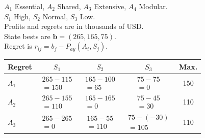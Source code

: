 {\noindent\begin{minipage}[t]{0.46\textwidth}
  \vspace{0pt}
  $A_1$ Essential, $A_2$ Shared, $A_3$ Extensive, $A_4$ Modular.\\
  $S_1$ High, $S_2$ Normal, $S_3$ Low.\\
  Profits and regrets are in thousands of USD.\\
  State bests are $\boldsymbol{b}=(265,165,75)$.\\
  Regret is $r_{ij}=b_j-P_{ay}(A_i,S_j)$.
\end{minipage}\hfill
\begin{minipage}[t]{0.51\textwidth}
  \vspace{0pt}\centering
  \setlength{\tabcolsep}{3pt}
  \renewcommand{\arraystretch}{1.2}
  \begin{tabular}{@{}lcccc@{}}
    \toprule
    Regret & $S_1$ & $S_2$ & $S_3$ & Max.\\ \midrule
    $A_1$ & $\begin{gathered}265-115\\=150\end{gathered}$ & $\begin{gathered}165-100\\=65\end{gathered}$ & $\begin{gathered}75-75\\=0\end{gathered}$ & 150\\
    $A_2$ & $\begin{gathered}265-155\\=110\end{gathered}$ & $\begin{gathered}165-165\\=0\end{gathered}$ & $\begin{gathered}75-45\\=30\end{gathered}$ & 110\\
    $A_3$ & $\begin{gathered}265-265\\=0\end{gathered}$ & $\begin{gathered}165-55\\=110\end{gathered}$ & $\begin{gathered}75-(-30)\\=105\end{gathered}$ & 110\\

\end{tabular}
\end{minipage}}
